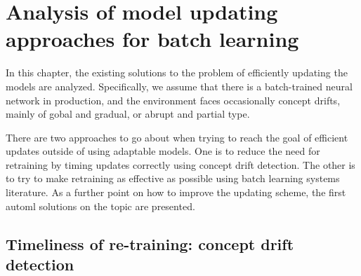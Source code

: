 \chapter{Analysis of model updating approaches for batch learning}


In this chapter, the existing solutions to the problem of efficiently updating the models are analyzed. Specifically, we assume that there is a batch-trained neural network in production, and the environment faces occasionally concept drifts, mainly of gobal and gradual, or abrupt and partial type.

There are two approaches to go about when trying to reach the goal of efficient updates outside of using adaptable models. One is to reduce the need for retraining by timing updates correctly using concept drift detection. The other is to try to make retraining as effective as possible using batch learning systems literature. As a further point on how to improve the updating scheme, the first automl solutions on the topic are presented.


\section{Timeliness of re-training: concept drift detection}


